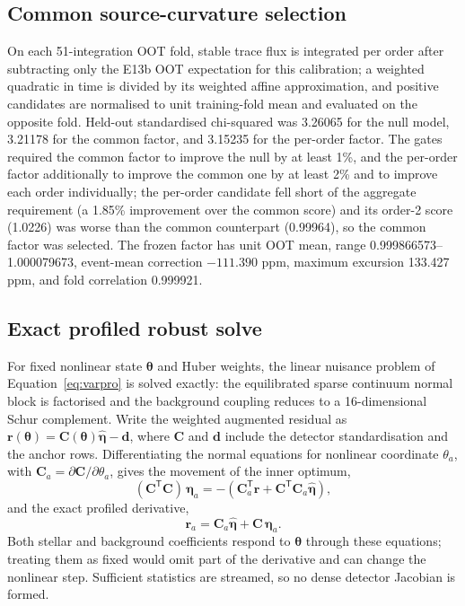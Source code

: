 \subsection{Common source-curvature selection}

On each 51-integration OOT fold, stable trace flux is integrated per order
after subtracting only the E13b OOT expectation for this calibration; a
weighted quadratic in time is divided by its weighted affine
approximation, and positive candidates are normalised to unit
training-fold mean and evaluated on the opposite fold. Held-out
standardised chi-squared was 3.26065 for the null model, 3.21178 for the
common factor, and 3.15235 for the per-order factor. The gates required
the common factor to improve the null by at least 1\%, and the per-order
factor additionally to improve the common one by at least 2\% and to
improve each order individually; the per-order candidate fell short of the aggregate requirement (a
1.85\% improvement over the common score) and its order-2 score (1.0226)
was worse than the common counterpart (0.99964), so the common factor was
selected. The frozen factor has unit OOT mean, range
0.999866573--1.000079673, event-mean correction $-111.390$ ppm, maximum
excursion 133.427 ppm, and fold correlation 0.999921.

\subsection{Exact profiled robust solve}

For fixed nonlinear state $\bm{\theta}$ and Huber weights, the linear
nuisance problem of Equation~\ref{eq:varpro} is solved exactly: the
equilibrated sparse continuum normal block is factorised and the
background coupling reduces to a 16-dimensional Schur complement. Write
the weighted augmented residual as
$\bm{r}(\bm{\theta})=\bm{C}(\bm{\theta})\widehat{\bm{\eta}}-\bm{d}$, where
$\bm{C}$ and $\bm{d}$ include the detector standardisation and the anchor
rows. Differentiating the normal equations for nonlinear coordinate
$\theta_a$, with $\bm{C}_a=\partial\bm{C}/\partial\theta_a$, gives the
movement of the inner optimum,
\begin{equation}
 (\bm{C}^{\mathsf T}\bm{C})\,\bm{\eta}_a
 =-\left(\bm{C}_a^{\mathsf T}\bm{r}
 +\bm{C}^{\mathsf T}\bm{C}_a\widehat{\bm{\eta}}\right),
\end{equation}
and the exact profiled derivative,
\begin{equation}
 \bm{r}_a=\bm{C}_a\widehat{\bm{\eta}}+\bm{C}\,\bm{\eta}_a .
\end{equation}
Both stellar and background coefficients respond to $\bm{\theta}$ through
these equations; treating them as fixed would omit part of the derivative
and can change the nonlinear step. Sufficient statistics are streamed, so
no dense detector Jacobian is formed.

